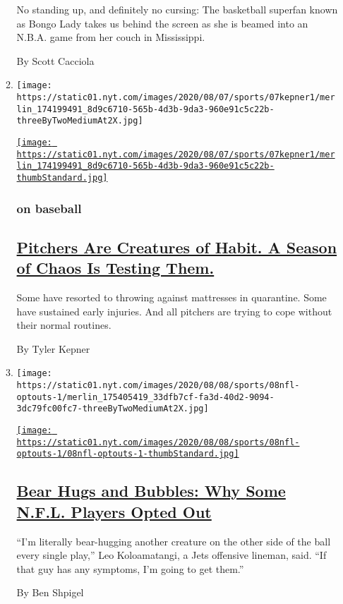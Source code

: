 \begin{enumerate}
\begin{enumerate}
    No standing up, and definitely no cursing: The basketball superfan
    known as Bongo Lady takes us behind the screen as she is beamed into
    an N.B.A. game from her couch in Mississippi.

    By Scott Cacciola
  \item
    \texttt{[image: https://static01.nyt.com/images/2020/08/07/sports/07kepner1/merlin\_174199491\_8d9c6710-565b-4d3b-9da3-960e91c5c22b-threeByTwoMediumAt2X.jpg]}

    \href{/2020/08/08/sports/baseball/mlb-pitching-injuries.html}{\texttt{[image: https://static01.nyt.com/images/2020/08/07/sports/07kepner1/merlin\_174199491\_8d9c6710-565b-4d3b-9da3-960e91c5c22b-thumbStandard.jpg]}}

    \hypertarget{on-baseball}{%
    \subsubsection{on baseball}\label{on-baseball}}

    \hypertarget{pitchers-are-creatures-of-habit-a-season-of-chaos-is-testing-them}{%
    \subsection{\texorpdfstring{\href{/2020/08/08/sports/baseball/mlb-pitching-injuries.html}{Pitchers
    Are Creatures of Habit. A Season of Chaos Is Testing
    Them.}}{Pitchers Are Creatures of Habit. A Season of Chaos Is Testing Them.}}\label{pitchers-are-creatures-of-habit-a-season-of-chaos-is-testing-them}}

    Some have resorted to throwing against mattresses in quarantine.
    Some have sustained early injuries. And all pitchers are trying to
    cope without their normal routines.

    By Tyler Kepner
  \item
    \texttt{[image: https://static01.nyt.com/images/2020/08/08/sports/08nfl-optouts-1/merlin\_175405419\_33dfb7cf-fa3d-40d2-9094-3dc79fc00fc7-threeByTwoMediumAt2X.jpg]}

    \href{/2020/08/08/sports/football/nfl-players-opt-out.html}{\texttt{[image: https://static01.nyt.com/images/2020/08/08/sports/08nfl-optouts-1/08nfl-optouts-1-thumbStandard.jpg]}}

    \hypertarget{bear-hugs-and-bubbles-why-some-nfl-players-opted-out}{%
    \subsection{\texorpdfstring{\href{/2020/08/08/sports/football/nfl-players-opt-out.html}{Bear
    Hugs and Bubbles: Why Some N.F.L. Players Opted
    Out}}{Bear Hugs and Bubbles: Why Some N.F.L. Players Opted Out}}\label{bear-hugs-and-bubbles-why-some-nfl-players-opted-out}}

    ``I'm literally bear-hugging another creature on the other side of
    the ball every single play,'' Leo Koloamatangi, a Jets offensive
    lineman, said. ``If that guy has any symptoms, I'm going to get
    them.''

    By Ben Shpigel
  \end{enumerate}
\end{enumerate}

